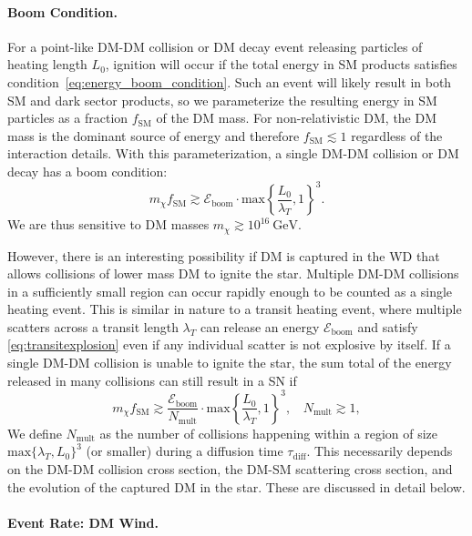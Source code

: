\documentclass[preprintnumbers,amsmath,amssymb,prd,superscriptaddress]{revtex4}
\newcommand{\Eboom}{\mathcal{E}_\text{boom}}
\newcommand{\GeV}{\text{GeV}}
\begin{document}
\paragraph{Boom Condition.}
For a point-like DM-DM collision or DM decay event releasing particles of heating length $L_0$, ignition will occur if the total energy in SM products satisfies condition~\eqref{eq:energy_boom_condition}.
Such an event will likely result in both SM and dark sector products, so we parameterize the resulting energy in SM particles as a fraction $f_\text{SM}$ of the DM mass.
For non-relativistic DM, the DM mass is the dominant source of energy and therefore $f_\text{SM} \lesssim 1$ regardless of the interaction details.
With this parameterization, a single DM-DM collision or DM decay has a boom condition:
\begin{equation}
\label{eq:coldecay}
  m_\chi f_\text{SM}  \gtrsim \Eboom \cdot \text{max} \left \{\frac{L_0}{\lambda_T}, 1 \right \}^3.
\end{equation}
We are thus sensitive to DM masses $m_\chi \gtrsim 10^{16} ~\GeV$.

However, there is an interesting possibility if DM is captured in the WD that allows collisions of lower mass DM to ignite the star. 
Multiple DM-DM collisions in a sufficiently small region can occur rapidly enough to be counted as a single heating event.
This is similar in nature to a transit heating event, where multiple scatters across a transit length $\lambda_T$ can release an energy $\Eboom$ and satisfy \eqref{eq:transitexplosion} even if any individual scatter is not explosive by itself.   
If a single DM-DM collision is unable to ignite the star, the sum total of the energy released in many collisions can still result in a SN if
\begin{equation}
\label{eq:multcolboom}
 m_\chi f_\text{SM} \gtrsim \frac{\Eboom}{N_\text{mult}} \cdot \text{max} \left \{\frac{L_0}{\lambda_T}, 1 \right \}^3, ~~~~ N_\text{mult} \gtrsim 1,
\end{equation}
We define $N_\text{mult}$ as the number of collisions happening within a region of size $\text{max}\{\lambda_T,L_0\}^3$ (or smaller) during a diffusion time $\tau_\text{diff}$.
This necessarily depends on the DM-DM collision cross section, the DM-SM scattering cross section, and the evolution of the captured DM in the star. 
These are discussed in detail below. 

\paragraph{Event Rate: DM Wind.}
\end{document}
